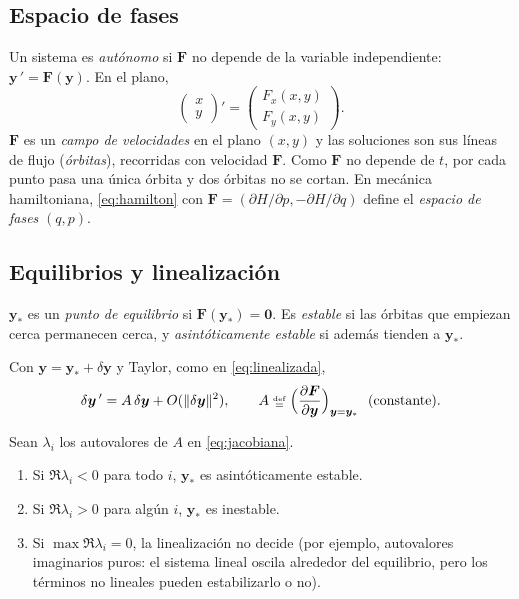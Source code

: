 \documentclass[11pt,twoside]{article}
\newcommand\vy{\bm{y}}
\newcommand\vF{\bm{F}}
\newcommand\mat[1]{\begin{pmatrix}#1\end{pmatrix}}
\begin{document}
\subsection{Espacio de fases}

Un sistema es \emph{autónomo} si $\vF$ no depende de la variable independiente: $\vy\,'=\vF(\vy)$. En el plano,
\begin{equation*}
\mat{x\\y}'=\mat{F_x(x,y)\\F_y(x,y)} .
\end{equation*}
$\vF$ es un \emph{campo de velocidades} en el plano $(x,y)$ y las soluciones son sus líneas de flujo
(\emph{órbitas}), recorridas con velocidad $\vF$. Como $\vF$ no depende de $t$, por cada punto pasa una única órbita
y dos órbitas no se cortan. En mecánica hamiltoniana, \eqref{eq:hamilton} con $\vF=(\partial H/\partial p,-\partial H/\partial q)$
define el \emph{espacio de fases} $(q,p)$.

\subsection{Equilibrios y linealización}

\begin{definicion}\label{def:equilibrio}
$\vy_*$ es un \emph{punto de equilibrio} si $\vF(\vy_*)=\bm0$. Es \emph{estable} si las órbitas que empiezan
cerca permanecen cerca, y \emph{asintóticamente estable} si además tienden a $\vy_*$.
\end{definicion}

Con $\vy=\vy_*+\delta\vy$ y Taylor, como en \eqref{eq:linealizada},
\begin{equation}\label{eq:jacobiana}
\delta\vy\,'=A\,\delta\vy+O(\norm{\delta\vy}^2),\qquad A\defeq\Big(\pd{\vF}{\vy}\Big)_{\vy=\vy_*}\ \ (\text{constante}).
\end{equation}

\begin{teorema}\label{teo:estabilidad}
Sean $\lambda_i$ los autovalores de $A$ en \eqref{eq:jacobiana}.
\begin{enumerate}
\item Si $\Re\lambda_i<0$ para todo $i$, $\vy_*$ es asintóticamente estable.
\item Si $\Re\lambda_i>0$ para algún $i$, $\vy_*$ es inestable.
\item Si $\max\Re\lambda_i=0$, la linealización no decide (por ejemplo, autovalores imaginarios puros: el sistema
lineal oscila alrededor del equilibrio, pero los términos no lineales pueden estabilizarlo o no).
\end{enumerate}
\end{teorema}
\end{document}
